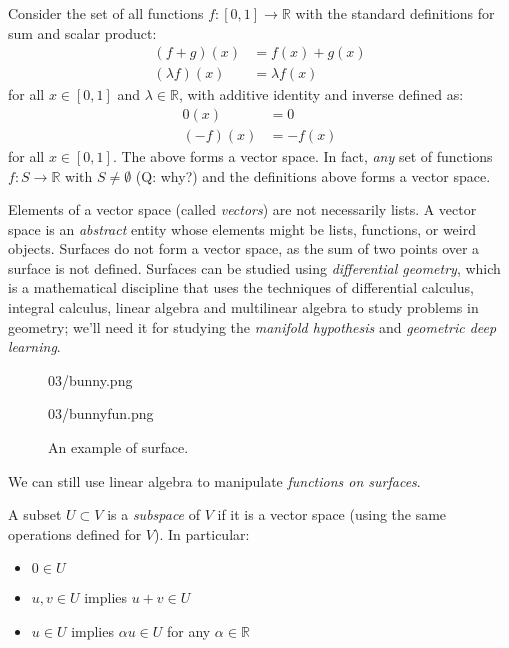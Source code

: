Consider the set of all functions $f: [0,1] \to \mathbb{R}$ with the standard definitions for sum and scalar product:
%
\begin{align*}
(f+g)(x) &= f(x) + g(x)\\
(\lambda f)(x) &= \lambda f(x)
\end{align*}
%
for all $x\in[0,1]$ and $\lambda \in\mathbb{R}$, with additive identity and inverse defined as:
%
\begin{align*}
0(x) &= 0\\
(-f)(x) &= -f(x)
\end{align*}
%
for all $x\in[0,1]$. The above forms a vector space. In fact, \emph{any} set of functions $f: S\to\mathbb{R}$ with $S\neq\emptyset$ (Q: why?) and the definitions above forms a vector space.

Elements of a vector space (called \emph{vectors}) are not necessarily lists. A vector space is an \emph{abstract} entity whose elements might be lists, functions, or weird objects. Surfaces do not form a vector space, as the sum of two points over a surface is not defined. Surfaces can be studied using \emph{differential geometry}, which is a mathematical discipline that uses the techniques of differential calculus, integral calculus, linear algebra and multilinear algebra to study problems in geometry; we'll need it for studying the \emph{manifold hypothesis} and \emph{geometric deep learning}.

\begin{figure}[H]
\begin{center}
{
		\begin{overpic}
		[trim=0cm 0cm 0cm 0cm,clip,width=0.4\linewidth]{03/bunny.png}
		\end{overpic}
}%
{
		\begin{overpic}
		[trim=0cm 0cm 0cm 0cm,clip,width=0.4\linewidth]{03/bunnyfun.png}
		\end{overpic}
}
\end{center}
\caption{An example of surface.}
\end{figure}
{
\medskip


\medskip
We can still use linear algebra to manipulate \emph{functions on surfaces}.
}

A subset $U\subset V$ is a \emph{subspace} of $V$ if it is a vector space (using the same operations defined for $V$). In particular:

\begin{itemize}
	\item $0\in U$
	\item $u,v\in U$ implies $u+v\in U$
	\item $u\in U$ implies $\alpha u \in U$ for any $\alpha\in\mathbb{R}$
\end{itemize}


